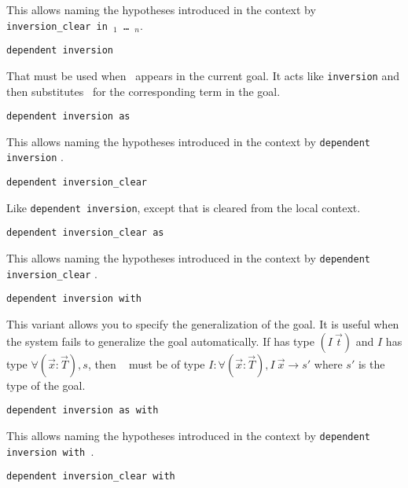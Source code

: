 \begin{coq_example*}
\begin{Variants}
  This allows naming the hypotheses introduced in the context by
  \texttt{inversion\_clear {\ident} in \ident$_1$ \dots\ \ident$_n$}.

\item {} \texttt{dependent inversion \ident}

  That must be used when \ident\ appears in the current goal.  It acts
  like \texttt{inversion} and then substitutes \ident\ for the
  corresponding term in the goal.

\item {} \texttt{dependent
    inversion {\ident} as \intropattern}

  This allows naming the hypotheses introduced in the context by
  \texttt{dependent inversion} {\ident}.

\item {} \texttt{dependent
    inversion\_clear \ident}

  Like \texttt{dependent inversion}, except that {\ident} is cleared
  from the local context.

\item {}
  \texttt{dependent inversion\_clear {\ident} as \intropattern}

  This allows naming the hypotheses introduced in the context by
  \texttt{dependent inversion\_clear} {\ident}.

\item {} \texttt{dependent
    inversion {\ident} with \term}

  This variant allows you to specify the generalization of the goal. It
  is useful when the system fails to generalize the goal automatically. If
  {\ident} has type $(I~\vec{t})$ and $I$ has type
  $\forall (\vec{x}:\vec{T}), s$,   then \term~  must be of type
  $I:\forall (\vec{x}:\vec{T}), I~\vec{x}\to s'$ where $s'$ is the
  type of the goal.

\item {}
  \texttt{dependent inversion {\ident} as {\intropattern}
  with \term}

  This allows naming the hypotheses introduced in the context by
  \texttt{dependent inversion {\ident} with \term}.

\item {}
  \texttt{dependent inversion\_clear {\ident} with \term}


\end{Variants}
\end{coq_example*}

